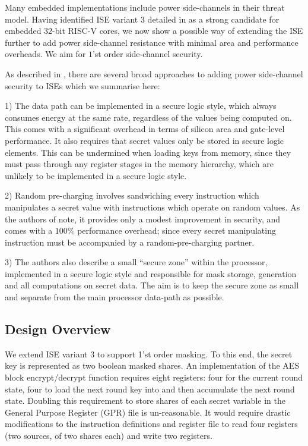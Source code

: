 
Many embedded implementations include power side-channels in their threat
model.
Having identified ISE variant $3$ detailed in
 as a strong candidate for embedded $32$-bit
RISC-V cores, we now show a possible
way of extending the ISE further to add power side-channel resistance
with minimal area and performance overheads.
We aim for $1$'st order side-channel security.

As described in \cite{TilGro:07}, there are several broad approaches
to adding power side-channel security to ISEs which we summarise here:

1) The data path can be implemented in a secure logic style, which always
consumes energy at the same rate, regardless of the values being computed on.
This comes with a significant overhead in terms of silicon area and
gate-level performance.
It also requires that secret values only be stored in secure logic
elements.
This can be undermined when loading keys from memory, since they must
pass through any register stages in the memory hierarchy, which are
unlikely to be implemented in a secure logic style.

2) Random pre-charging involves sandwiching every instruction which
manipulates a secret value with instructions which operate on random values.
As the authors of \cite{TilGro:07} note, it provides only a modest
improvement in security, and comes with a $100\%$ performance overhead;
since every secret manipulating instruction must be accompanied by
a random-pre-charging partner.

3) The authors also describe a small ``secure zone'' within the processor,
implemented in a secure logic style and responsible for
mask storage, generation and all computations on secret data.
The aim is to keep the secure zone as small and separate from the main
processor data-path as possible.

\subsection{Design Overview}

We extend ISE variant $3$ to support 1'st order masking.
To this end, the secret key is represented as two boolean masked shares.
An implementation of the AES block encrypt/decrypt function requires
eight registers: four for the current round state, four to load the
next round key into and then accumulate the next round state.
Doubling this requirement to store shares of each secret variable
in the General Purpose Register (GPR) file is un-reasonable.
It would require drastic modifications to the instruction definitions and
register file to read four registers (two sources, of two shares each) and
write two registers.

